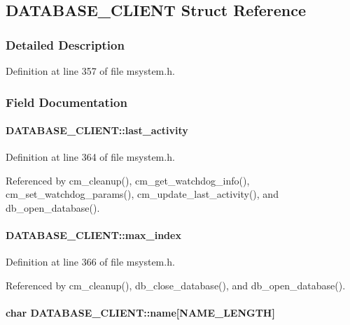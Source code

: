 \subsection{DATABASE\_\-CLIENT Struct Reference}
\label{structDATABASE__CLIENT}


\subsubsection{Detailed Description}


Definition at line 357 of file msystem.h.

\subsubsection{Field Documentation}
\paragraph[{last\_\-activity}]{ {\bf DATABASE\_\-CLIENT::last\_\-activity}}\hfill\label{structDATABASE__CLIENT_a5608ac1dd265c08eb0ba01030c906078}


Definition at line 364 of file msystem.h.

Referenced by cm\_\-cleanup(), cm\_\-get\_\-watchdog\_\-info(), cm\_\-set\_\-watchdog\_\-params(), cm\_\-update\_\-last\_\-activity(), and db\_\-open\_\-database().
\paragraph[{max\_\-index}]{ {\bf DATABASE\_\-CLIENT::max\_\-index}}\hfill\label{structDATABASE__CLIENT_a74b19cf9d978b0f84b52a2e29b7f89b1}


Definition at line 366 of file msystem.h.

Referenced by cm\_\-cleanup(), db\_\-close\_\-database(), and db\_\-open\_\-database().
\paragraph[{name}]{\setlength{\rightskip}{0pt plus 5cm}char {\bf DATABASE\_\-CLIENT::name}\mbox{[}NAME\_\-LENGTH\mbox{]}}\hfill\label{structDATABASE__CLIENT_a6fec82d0f69157d4c8376d79d0d26e85}


